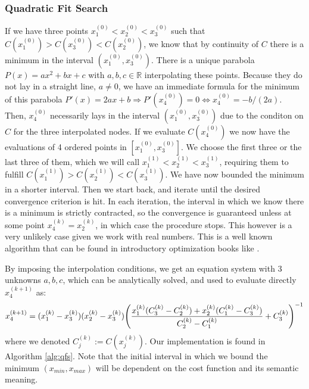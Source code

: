 \documentclass[11pt, a4paper, twoside]{article} %
\newcommand{\R}{\mathbb{R}} %
\begin{document}
\subsubsection*{Quadratic Fit Search}\vspace{-0.25cm}
If we have three points $x_1^{(0)}<x_2^{(0)}<x_3^{(0)}$ such that $C(x_1^{(0)})>C(x_3^{(0)})<C(x_2^{(0)})$, we know that by continuity of $C$ there is a minimum in the interval $(x_1^{(0)},x_3^{(0)})$. There is a unique parabola $P(x)=ax^2+bx+c$ with $a,b,c\in\R$ interpolating these points. Because they do not lay in a straight line, $a\neq 0$, we have an immediate formula for the minimum of this parabola $P'(x)=2ax+b\Rightarrow P'(x_4^{(0)})=0\Leftrightarrow x_4^{(0)}=-b/(2a)$. Then, $x_4^{(0)}$ necessarily lays in the interval $(x_1^{(0)}, x_3^{(0)})$ due to the conditon on $C$ for the three interpolated nodes. If we evaluate $C(x_4^{(0)})$ we now have the evaluations of 4 ordered points in $[x_1^{(0)},x_3^{(0)}]$. We choose the first three or the last three of them, which we will call $x_1^{(1)}<x_2^{(1)}< x_3^{(1)}$, requiring them to fulfill $C(x_1^{(1)})>C(x_2^{(1)})< C(x_3^{(1)})$. We have now bounded the minimum in a shorter interval. Then we start back, and iterate until the desired convergence criterion is hit. In each iteration, the interval in which we know there is a minimum is strictly contracted, so the convergence is guaranteed unless at some point $x_4^{(k)}=x_2^{(k)}$, in which case the procedure stops. This however is a very unlikely case given we work with real numbers. This is a well known algorithm that can be found in introductory optimization books like \cite{opt}. 

By imposing the interpolation conditions, we get an equation system with 3 unknowns $a,b,c$, which can be analytically solved, and used to evaluate directly $x_4^{(k+1)}$ as:\vspace{-0.2cm}
\begin{equation}\label{par}
x_4^{(k+1)}=(x_1^{(k)}-x_3^{(k)})(x_2^{(k)}-x_3^{(k)})\qty(\frac{x_1^{(k)}(C_3^{(k)}-C_2^{(k)})+x_2^{(k)}(C_1^{(k)}-C_3^{(k)})}{C_2^{(k)}-C_1^{(k)}}+C_3^{(k)})^{-1}\vspace{-0.2cm}
\end{equation}
where we denoted $C_j^{(k)}:=C(x_j^{(k)})$. Our implementation is found in Algorithm \ref{alg:qfs}. Note that the initial interval in which we bound the minimum $(x_{min},x_{max})$ will be dependent on the cost function and its semantic meaning.
\end{document}
